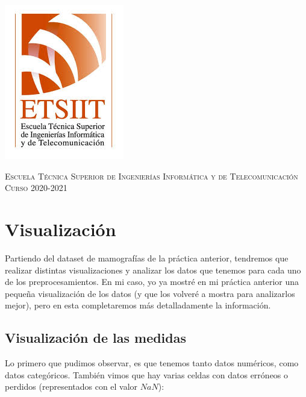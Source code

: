 \documentclass[11pt,a4paper]{article}
\begin{document}
\begin{titlepage}
\begin{minipage}{\textwidth}
\includegraphics[scale=0.3]{img/etsiit.jpeg}

\vspace{0.3cm}
\textsc{Escuela Técnica Superior de Ingenierías Informática y de Telecomunicación}\\
\vspace{1cm}
\textsc{Curso 2020-2021}
\end{minipage}
\end{titlepage}

\tableofcontents
\thispagestyle{empty}				%

\newpage

\setlength{\parskip}{1em}



\section{Visualización}

Partiendo del dataset de mamografías de la práctica anterior, tendremos que realizar distintas visualizaciones y analizar los
datos que tenemos para cada uno de los preprocesamientos. En mi caso, yo ya mostré en mi práctica anterior una pequeña visualización
de los datos (y que los volveré a mostra para analizarlos mejor), pero en esta completaremos más detalladamente la información.

\subsection{Visualización de las medidas}

Lo primero que pudimos observar, es que tenemos tanto datos numéricos, como datos categóricos. También vimos que hay varias celdas
con datos erróneos o perdidos (representados con el valor $NaN$):
\end{document}
